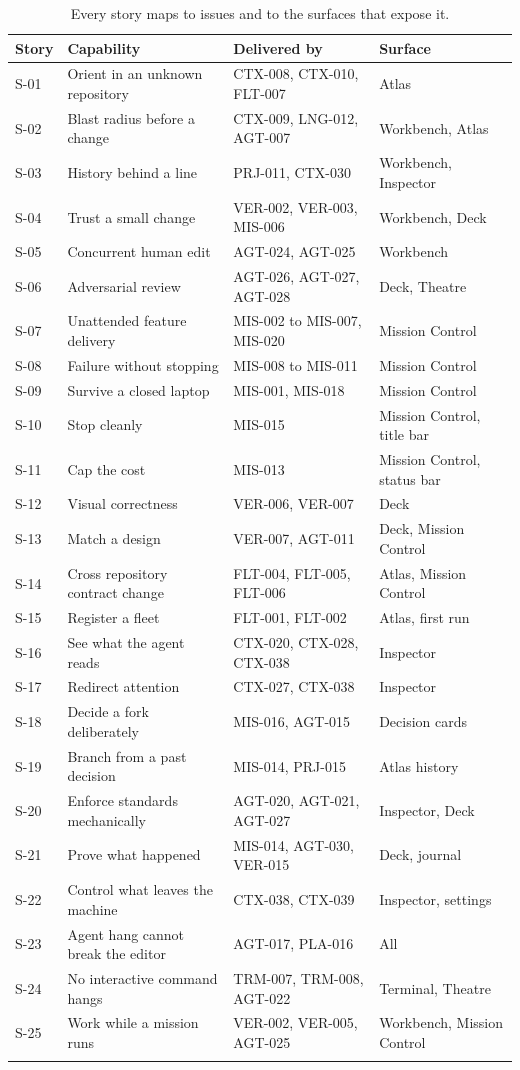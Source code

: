 \begin{longtable}{@{}p{} p{} p{} p{}@{}}
\toprule
\textbf{Story} & \textbf{Capability} & \textbf{Delivered by} & \textbf{Surface} \\
\midrule
\endhead
S-01 & Orient in an unknown repository & CTX-008, CTX-010, FLT-007 & Atlas \\
S-02 & Blast radius before a change & CTX-009, LNG-012, AGT-007 & Workbench, Atlas \\
S-03 & History behind a line & PRJ-011, CTX-030 & Workbench, Inspector \\
S-04 & Trust a small change & VER-002, VER-003, MIS-006 & Workbench, Deck \\
S-05 & Concurrent human edit & AGT-024, AGT-025 & Workbench \\
S-06 & Adversarial review & AGT-026, AGT-027, AGT-028 & Deck, Theatre \\
S-07 & Unattended feature delivery & MIS-002 to MIS-007, MIS-020 & Mission Control \\
S-08 & Failure without stopping & MIS-008 to MIS-011 & Mission Control \\
S-09 & Survive a closed laptop & MIS-001, MIS-018 & Mission Control \\
S-10 & Stop cleanly & MIS-015 & Mission Control, title bar \\
S-11 & Cap the cost & MIS-013 & Mission Control, status bar \\
S-12 & Visual correctness & VER-006, VER-007 & Deck \\
S-13 & Match a design & VER-007, AGT-011 & Deck, Mission Control \\
S-14 & Cross repository contract change & FLT-004, FLT-005, FLT-006 & Atlas, Mission Control \\
S-15 & Register a fleet & FLT-001, FLT-002 & Atlas, first run \\
S-16 & See what the agent reads & CTX-020, CTX-028, CTX-038 & Inspector \\
S-17 & Redirect attention & CTX-027, CTX-038 & Inspector \\
S-18 & Decide a fork deliberately & MIS-016, AGT-015 & Decision cards \\
S-19 & Branch from a past decision & MIS-014, PRJ-015 & Atlas history \\
S-20 & Enforce standards mechanically & AGT-020, AGT-021, AGT-027 & Inspector, Deck \\
S-21 & Prove what happened & MIS-014, AGT-030, VER-015 & Deck, journal \\
S-22 & Control what leaves the machine & CTX-038, CTX-039 & Inspector, settings \\
S-23 & Agent hang cannot break the editor & AGT-017, PLA-016 & All \\
S-24 & No interactive command hangs & TRM-007, TRM-008, AGT-022 & Terminal, Theatre \\
S-25 & Work while a mission runs & VER-002, VER-005, AGT-025 & Workbench, Mission Control \\
\bottomrule
\caption{Every story maps to issues and to the surfaces that expose it.}
\end{longtable}

